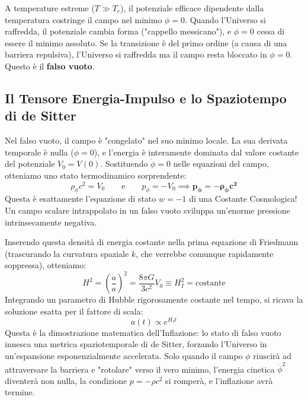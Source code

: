 \documentclass[11pt,a4paper]{report}
\begin{document}
A temperature estreme ($T \gg T_c$), il potenziale efficace dipendente dalla temperatura costringe il campo nel minimo $\phi = 0$. Quando l'Universo si raffredda, il potenziale cambia forma ("cappello messicano"), e $\phi = 0$ cessa di essere il minimo assoluto. 
Se la transizione è del primo ordine (a causa di una barriera repulsiva), l'Universo si raffredda ma il campo resta bloccato in $\phi = 0$. Questo è il \textbf{falso vuoto}. 

\subsection{Il Tensore Energia-Impulso e lo Spaziotempo di de Sitter}
Nel falso vuoto, il campo è "congelato" nel suo minimo locale. La sua derivata temporale è nulla ($\dot{\phi} = 0$), e l'energia è interamente dominata dal valore costante del potenziale $V_0 = V(0)$. Sostituendo $\dot{\phi}=0$ nelle equazioni del campo, otteniamo uno stato termodinamico sorprendente:
\begin{equation}
\rho_\phi c^2 = V_0 \qquad \text{e} \qquad p_\phi = -V_0 \implies \mathbf{p_\phi = -\rho_\phi c^2}
\end{equation}
Questa è esattamente l'equazione di stato $w = -1$ di una Costante Cosmologica! Un campo scalare intrappolato in un falso vuoto sviluppa un'enorme pressione intrinsecamente negativa.

Inserendo questa densità di energia costante nella prima equazione di Friedmann (trascurando la curvatura spaziale $k$, che verrebbe comunque rapidamente soppressa), otteniamo:
\begin{equation}
H^2 = \left(\frac{\dot{a}}{a}\right)^2 = \frac{8\pi G}{3 c^2} V_0 \equiv H_I^2 = \text{costante}
\end{equation}
Integrando un parametro di Hubble rigorosamente costante nel tempo, si ricava la soluzione esatta per il fattore di scala:
\begin{equation}
a(t) \propto e^{H_I t}
\end{equation}
Questa è la dimostrazione matematica dell'Inflazione: lo stato di falso vuoto innesca una metrica spaziotemporale di de Sitter, forzando l'Universo in un'espansione esponenzialmente accelerata. Solo quando il campo $\phi$ riuscirà ad attraversare la barriera e "rotolare" verso il vero minimo, l'energia cinetica $\dot{\phi}^2$ diventerà non nulla, la condizione $p = -\rho c^2$ si romperà, e l'inflazione avrà termine.

\end{document}
